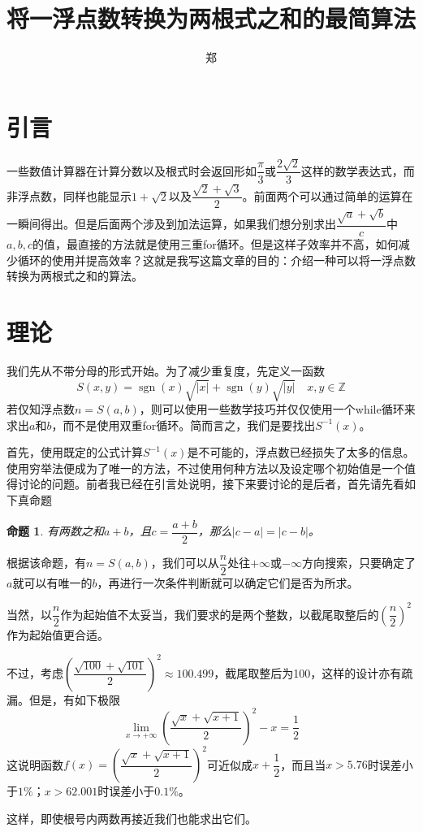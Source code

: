 \documentclass[a4paper, UTF8]{ctexart}
\title{将一浮点数转换为两根式之和的最简算法}
\author{郑}
\newtheorem{proposition}{命题}
\DeclareMathOperator{\sgn}{\mathrm{sgn}}
\begin{document}
\maketitle

\section{引言}
一些数值计算器在计算分数以及根式时会返回形如$\dfrac{\pi}{3}$或$\dfrac{2\sqrt{2}}{3}$这样的数学表达式，而非浮点数，同样也能显示$1+\sqrt{2}$以及$\dfrac{\sqrt{2}+\sqrt{3}}{2}$。前面两个可以通过简单的运算在一瞬间得出。但是后面两个涉及到加法运算，如果我们想分别求出$\dfrac{\sqrt{a}+\sqrt{b}}{c}$中$a,b,c$的值，最直接的方法就是使用三重for循环。但是这样子效率并不高，如何减少循环的使用并提高效率？这就是我写这篇文章的目的：介绍一种可以将一浮点数转换为两根式之和的算法。

\section{理论}
我们先从不带分母的形式开始。为了减少重复度，先定义一函数\[S(x,y)=\sgn(x)\sqrt{|x|}+\sgn(y)\sqrt{|y|} \quad x,y\in\mathbb{Z}\]若仅知浮点数$n=S(a,b)$，则可以使用一些数学技巧并仅仅使用一个while循环来求出$a$和$b$，而不是使用双重for循环。简而言之，我们是要找出$S^{-1}(x)$。

首先，使用既定的公式计算$S^{-1}(x)$是不可能的，浮点数已经损失了太多的信息。使用穷举法便成为了唯一的方法，不过使用何种方法以及设定哪个初始值是一个值得讨论的问题。前者我已经在引言处说明，接下来要讨论的是后者，首先请先看如下真命题
\begin{proposition}
    有两数之和$a+b$，且$c=\dfrac{a+b}{2}$，那么$|c-a|=|c-b|$。
\end{proposition}
根据该命题，有$n=S(a,b)$，我们可以从$\dfrac{n}{2}$处往$+\infty$或$-\infty$方向搜索，只要确定了$a$就可以有唯一的$b$，再进行一次条件判断就可以确定它们是否为所求。

当然，以$\dfrac{n}{2}$作为起始值不太妥当，我们要求的是两个整数，以截尾取整后的$\left(\dfrac{n}{2}\right)^2$作为起始值更合适。

不过，考虑$\left(\dfrac{\sqrt{100}+\sqrt{101}}{2}\right)^2\approx100.499$，截尾取整后为100，这样的设计亦有疏漏。但是，有如下极限\[\lim_{x\to+\infty} \left(\frac{\sqrt{x}+\sqrt{x+1}}{2}\right)^2-x=\frac{1}{2}\]这说明函数$f(x)=\left(\dfrac{\sqrt{x}+\sqrt{x+1}}{2}\right)^2$可近似成$x+\dfrac{1}{2}$，而且当$x>5.76$时误差小于$1\%$；$x>62.001$时误差小于$0.1\%$。

这样，即使根号内两数再接近我们也能求出它们。
\end{document}
